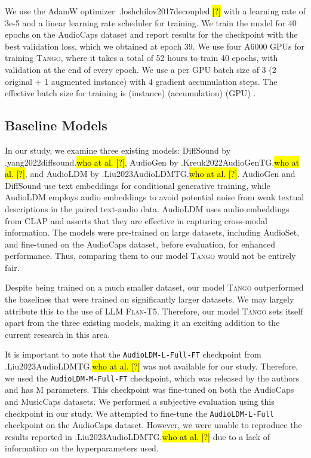\documentclass{article}
\newcommand{\model}{\textsc{Tango}}
\let\realcite\cite
\renewcommand{\cite}[1]{\ifx.#1.\hl{[?]}\else\realcite{#1}\fi}
\let\realcitet\citet
\renewcommand{\citet}[1]{\ifx.#1.\hl{who at al. [?]}\else\realcitet{#1}\fi}
\begin{document}
We use the AdamW optimizer~\cite{loshchilov2017decoupled} with a learning rate of 3e-5 and a linear learning rate scheduler for training. We train the model for 40 epochs on the AudioCaps dataset and report results for the checkpoint with the best validation loss, which we obtained at epoch 39. We use four A6000 GPUs for training \model{}, where it takes a total of 52 hours to train 40 epochs, with validation at the end of every epoch. We use a per GPU batch size of 3 (2 original + 1 augmented instance) with 4 gradient accumulation steps. The effective batch size for training is  (instance)  (accumulation)  (GPU) . 

\subsection{Baseline Models}
In our study, we examine three existing models: DiffSound by \citet{yang2022diffsound}, AudioGen by \citet{Kreuk2022AudioGenTG}, and AudioLDM by \citet{Liu2023AudioLDMTG}. AudioGen and DiffSound use text embeddings for conditional generative training, while AudioLDM employs audio embeddings to avoid potential noise from weak textual descriptions in the paired text-audio data. AudioLDM uses audio embeddings from CLAP and asserts that they are effective in capturing cross-modal information. The models were pre-trained on large datasets, including AudioSet, and fine-tuned on the AudioCaps dataset, before evaluation, for enhanced performance. Thus, comparing them to our model \model{} would not be entirely fair.

Despite being trained on a much smaller dataset, our model \model{} outperformed the baselines that were trained on significantly larger datasets. We may largely attribute this to the use of LLM \textsc{Flan-T5}. Therefore, our model \model{} sets itself apart from the three existing models, making it an exciting addition to the current research in this area.

It is important to note that the \texttt{AudioLDM-L-Full-FT} checkpoint from \citet{Liu2023AudioLDMTG} was not available for our study. Therefore, we used the \texttt{AudioLDM-M-Full-FT} checkpoint, which was released by the authors and has M parameters. This checkpoint was fine-tuned on both the AudioCaps and MusicCaps datasets. We performed a subjective evaluation using this checkpoint in our study. We attempted to fine-tune the \texttt{AudioLDM-L-Full} checkpoint on the AudioCaps dataset. However, we were unable to reproduce the results reported in \citet{Liu2023AudioLDMTG} due to a lack of information on the hyperparameters used.
\end{document}
